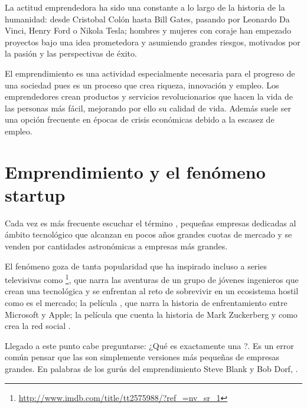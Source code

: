 La actitud emprendedora ha sido una constante a lo largo de la historia de la humanidad: desde Cristobal Colón hasta Bill Gates, pasando por Leonardo Da Vinci, Henry Ford o Nikola Tesla; hombres y mujeres con coraje han empezado proyectos bajo una idea prometedora y asumiendo grandes riesgos, motivados por la pasión y las perspectivas de éxito. 

El emprendimiento es una actividad especialmente necesaria para el progreso de una sociedad pues es un proceso que crea riqueza, innovación y empleo. Los emprendedores crean productos y servicios revolucionarios que hacen la vida de las personas más fácil, mejorando por ello su calidad de vida. Además suele ser una opción frecuente en épocas de crisis económicas debido a la escasez de empleo.

\section{Emprendimiento y el fenómeno startup}

Cada vez es más frecuente escuchar el término , pequeñas empresas dedicadas al ámbito tecnológico que alcanzan en pocos años grandes cuotas de mercado y se venden por cantidades astronómicas a empresas más grandes.

El fenómeno goza de tanta popularidad que ha inspirado incluso a series televisivas como \footnote{\url{http://www.imdb.com/title/tt2575988/?ref_=nv_sr_1}}, que narra las aventuras de un grupo de jóvenes ingenieros que crean una  tecnológica y se enfrentan al reto de sobrevivir en un ecosistema hostil como es el mercado; la película , que narra la historia de enfrentamiento entre Microsoft y Apple; la película  que cuenta la historia de Mark Zuckerberg y como crea la red social .

Llegado a este punto cabe preguntarse: ¿Qué es exactamente una ?. Es un error común pensar que las  son simplemente versiones más pequeñas de empresas grandes. En palabras de los gurús del emprendimiento Steve Blank y Bob Dorf, \cite{steveblankbobdorf2013}.

